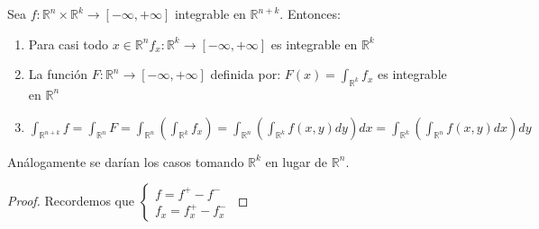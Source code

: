 \begin{teorema}
    Sea $f: \mathbb{R}^n \times \mathbb{R}^k \to [-\infty, +\infty]$ integrable en $\mathbb{R}^{n+k}$. Entonces:
    \vspace{-0.5em}
    \begin{enumerate}
        \item Para casi todo $x \in \mathbb{R}^{n} f_x: \mathbb{R}^k \to [-\infty, +\infty]$
              es integrable en $\mathbb{R}^k$
        \item La función $F: \mathbb{R}^n \to [-\infty, +\infty]$ definida por: $F(x) =
                  \int_{\mathbb{R}^k}f_x$ es integrable en $\mathbb{R}^n$
        \item $\int_{\mathbb{R}^{n+k}}f = \int_{\mathbb{R}^n}F = \int_{\mathbb{R}^n}(\int_{\mathbb{R}^k}f_x) = \int_{\mathbb{R}^n}(\int_{\mathbb{R}^k}f(x,y)dy)dx = \int_{\mathbb{R}^k}(\int_{\mathbb{R}^n}f(x,y)dx)dy$
    \end{enumerate}
    Análogamente se darían los casos tomando $\mathbb{R}^k$ en lugar de $\mathbb{R}^n$.
\end{teorema}
\begin{proof}
    Recordemos que $\begin{cases} f = f^+ -f^- \\ f_x = f_x^+ - f_x^- \end{cases}$
\end{proof}

